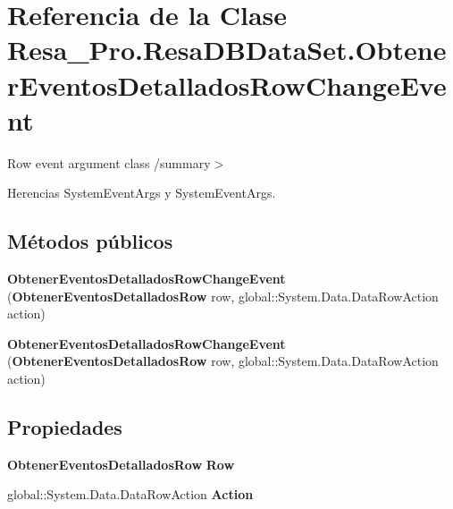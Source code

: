 \section{Referencia de la Clase Resa\+\_\+\+Pro.\+Resa\+D\+B\+Data\+Set.\+Obtener\+Eventos\+Detallados\+Row\+Change\+Event}
\label{class_resa___pro_1_1_resa_d_b_data_set_1_1_obtener_eventos_detallados_row_change_event}


Row event argument class /summary$>$  




Herencias System\+Event\+Args y System\+Event\+Args.

\subsection*{Métodos públicos}
\begin{DoxyCompactItemize}
\item 
{\bfseries Obtener\+Eventos\+Detallados\+Row\+Change\+Event} ({\bf Obtener\+Eventos\+Detallados\+Row} row, global\+::\+System.\+Data.\+Data\+Row\+Action action)\label{class_resa___pro_1_1_resa_d_b_data_set_1_1_obtener_eventos_detallados_row_change_event_a4e7a1be435ca003e21850219481a10f1}

\item 
{\bfseries Obtener\+Eventos\+Detallados\+Row\+Change\+Event} ({\bf Obtener\+Eventos\+Detallados\+Row} row, global\+::\+System.\+Data.\+Data\+Row\+Action action)\label{class_resa___pro_1_1_resa_d_b_data_set_1_1_obtener_eventos_detallados_row_change_event_a4e7a1be435ca003e21850219481a10f1}

\end{DoxyCompactItemize}
\subsection*{Propiedades}
\begin{DoxyCompactItemize}
\item 
{\bf Obtener\+Eventos\+Detallados\+Row} {\bfseries Row}\hspace{0.3cm}{\ttfamily  [get]}\label{class_resa___pro_1_1_resa_d_b_data_set_1_1_obtener_eventos_detallados_row_change_event_a771517587affd308c3d22217cdb66094}

\item 
global\+::\+System.\+Data.\+Data\+Row\+Action {\bfseries Action}\hspace{0.3cm}{\ttfamily  [get]}\label{class_resa___pro_1_1_resa_d_b_data_set_1_1_obtener_eventos_detallados_row_change_event_ac7d6ab2cb28af85d7d45064f626819ef}

\end{DoxyCompactItemize}


